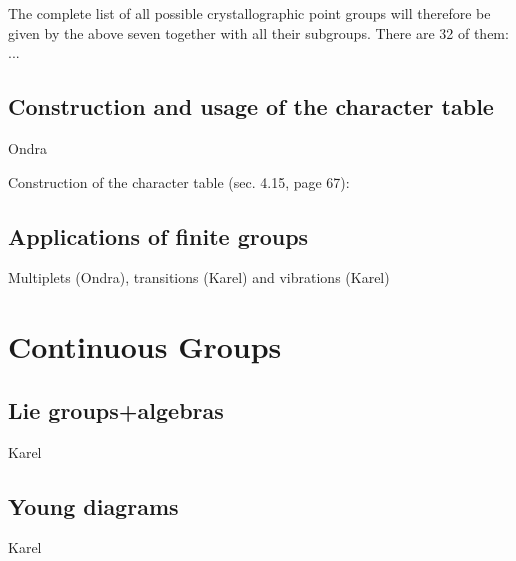 The complete list of all possible crystallographic point groups will therefore
be given by the above seven together with all their subgroups. There are 32 of
them: ...

\section{Construction and usage of the character table}

Ondra

Construction of the character table \cite{elliott} (sec. 4.15, page 67):

\section{Applications of finite groups}

Multiplets (Ondra), transitions (Karel) and vibrations (Karel)




\chapter{Continuous Groups}

\section{Lie groups+algebras}

Karel

\section{Young diagrams}

Karel
